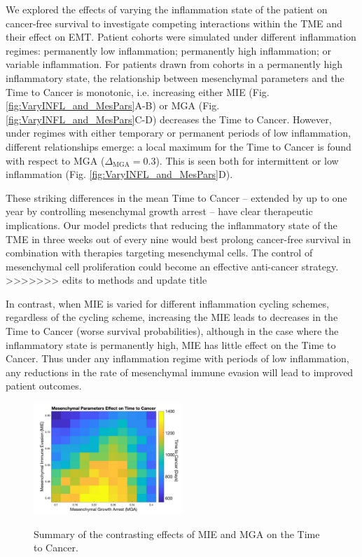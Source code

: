 \documentclass[11pt]{article}
\begin{document}
We explored the effects of varying the inflammation state of the patient on cancer-free survival to investigate competing interactions within the TME and their effect on EMT. Patient cohorts were simulated under different inflammation regimes: permanently low inflammation; permanently high inflammation; or variable inflammation. For patients drawn from cohorts in a permanently high inflammatory state, the relationship between mesenchymal parameters and the Time to Cancer is monotonic, i.e. increasing either MIE (Fig. \ref{fig:VaryINFL_and_MesPars}A-B) or MGA (Fig. \ref{fig:VaryINFL_and_MesPars}C-D) decreases the Time to Cancer.
However, under regimes with either temporary or permanent periods of low inflammation, different relationships emerge: a local maximum for the Time to Cancer is found with respect to MGA ($\Delta_\text{MGA}= 0.3$). This is seen both for intermittent or low inflammation (Fig. \ref{fig:VaryINFL_and_MesPars}D). 
\par
These striking differences in the mean Time to Cancer -- extended by up to one year by controlling mesenchymal growth arrest -- have clear therapeutic implications. 
Our model predicts that reducing the inflammatory state of the TME in three weeks out of every nine would best prolong cancer-free survival in combination with therapies targeting mesenchymal cells. The control of mesenchymal cell proliferation could become an effective anti-cancer strategy.
>>>>>>> edits to methods and update title
\par
In contrast, when MIE is varied for different inflammation cycling schemes, regardless of the cycling scheme, increasing the MIE leads to decreases in the Time to Cancer (worse survival probabilities), although in the case where the inflammatory state is permanently high, MIE has little effect on the Time to Cancer. Thus under any inflammation regime with periods of low inflammation, any reductions in the rate of mesenchymal immune evasion will lead to improved patient outcomes.

\begin{figure}
\center
{\includegraphics[width=0.5\textwidth]{Figure5/MIEvsMGA_bigcbar.jpg}}
\caption{Summary of the contrasting effects of MIE and MGA on the Time to Cancer.
}
\label{fig:MIEvsMGA}
\end{figure}
\end{document}
